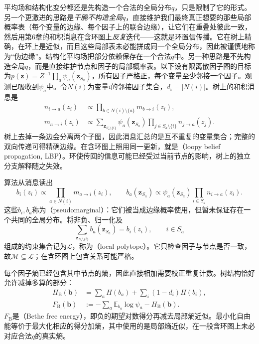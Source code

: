 平均场和结构化变分都还是先构造一个合法的全局分布$q$，只是限制了它的形式。另一个更激进的思路是\emph{干脆不构造全局$q$}，直接维护我们最终真正想要的那些局部概率表（每个变量的边缘、每个因子上的联合边缘），让它们在重叠处彼此一致，然后用第6章的和积消息在含环图上\emph{反复}迭代——这就是环置信传播。它在树上精确，在环上是近似，而且这些局部表未必能拼成同一个全局分布，因此被谨慎地称为“伪边缘”。结构化平均场把部分依赖保存在一个合法$q$中。另一种思路是不先构造全局$q$，而是直接维护节点和因子的局部概率表。以下设有限离散因子图的目标为$p(\bm z)=Z^{-1}\prod_a\psi_a(\bm z_{S_a})$，所有因子严格正，每个变量至少邻接一个因子。观测已吸收到$\psi_a$中。令$N(i)$为变量$i$的邻接因子集合，$d_i=|N(i)|$。树上的和积消息是
\begin{equation}
  \begin{aligned}
    n_{i\to a}(z_i)
      &\propto\prod_{b\in N(i)\setminus\{a\}}m_{b\to i}(z_i),\\
    m_{a\to i}(z_i)
      &\propto\sum_{\bm z_{S_a\setminus\{i\}}}
            \psi_a(\bm z_{S_a})
            \prod_{j\in S_a\setminus\{i\}}n_{j\to a}(z_j).
  \end{aligned}
  \label{eq:pgm-variational-lbp}
\end{equation}
树上去掉一条边会分离两个子图，因此消息汇总的是互不重复的变量集合；完整的双向传递可得精确边缘。在含环图上照用同一更新，就是（loopy belief propagation, LBP）。环使传回的信息可能已经受过当前节点的影响，树上的独立分支解释随之失效。

算法从消息读出
\[
  b_i(z_i)\propto\prod_{a\in N(i)}m_{a\to i}(z_i),
  \qquad
  b_a(\bm z_{S_a})\propto\psi_a(\bm z_{S_a})
                         \prod_{i\in S_a}n_{i\to a}(z_i).
\]
这些$b_i,b_a$称为（pseudomarginal）：它们被当成边缘概率使用，但暂未保证存在一个共同的全局分布。将非负、归一化及
\begin{equation}
  \sum_{\bm z_{S_a\setminus\{i\}}}b_a(\bm z_{S_a})=b_i(z_i),
  \qquad i\in S_a
  \label{eq:pgm-variational-local-consistency}
\end{equation}
组成的约束集合记为$\mathcal L$，称为（local polytope）。它只检查因子与节点是否一致，故$\mathcal M\subseteq\mathcal L$；在含环图上包含关系可能严格。

每个因子熵已经包含其中节点的熵，因此直接相加需要校正重复计数。树结构恰好允许减掉多算的部分：
\begin{equation}
  \begin{aligned}
    H_{\mathrm B}(\bm b)
      &=\sum_aH(b_a)+\sum_i(1-d_i)H(b_i),\\
    F_{\mathrm B}(\bm b)
      &:=-\sum_a\mathbb E_{b_a}\log\psi_a-H_{\mathrm B}(\bm b).
  \end{aligned}
  \label{eq:pgm-variational-bethe}
\end{equation}
$F_{\mathrm B}$是（Bethe free energy），即负的期望对数得分再减去局部熵近似。最小化自由能等价于最大化相应的得分加熵，其中使用的是局部熵近似，在一般含环图上未必对应合法$q$的真实熵。

